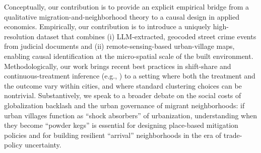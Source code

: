 Conceptually, our contribution is to provide an explicit empirical bridge from a qualitative migration-and-neighborhood theory to a causal design in applied economics. Empirically, our contribution is to introduce a uniquely high-resolution dataset that combines (i) LLM-extracted, geocoded street crime events from judicial documents and (ii) remote-sensing-based urban-village maps, enabling causal identification at the micro-spatial scale of the built environment. Methodologically, our work brings recent best practices in shift-share and continuous-treatment inference (e.g., \citealp{goldsmithpinkham2020bartik,adao2019shiftshare}) to a setting where both the treatment and the outcome vary within cities, and where standard clustering choices can be nontrivial. Substantively, we speak to a broader debate on the social costs of globalization backlash and the urban governance of migrant neighborhoods: if urban villages function as ``shock absorbers'' of urbanization, understanding when they become ``powder kegs'' is essential for designing place-based mitigation policies and for building resilient ``arrival'' neighborhoods in the era of trade-policy uncertainty.

